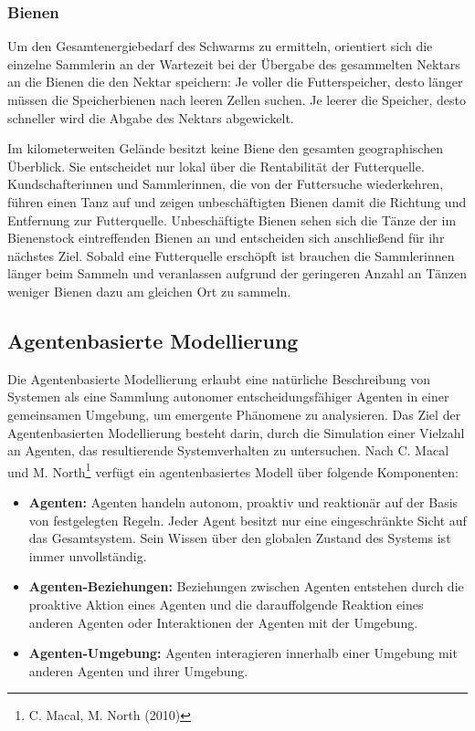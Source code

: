 \documentclass[a4paper, 11pt]{article}
\begin{document}
\subsubsection{Bienen}
Um den Gesamtenergiebedarf des Schwarms zu ermitteln, orientiert sich die einzelne Sammlerin an der Wartezeit bei der Übergabe des gesammelten Nektars an die Bienen die den Nektar speichern: Je voller die Futterspeicher, desto länger müssen die Speicherbienen nach leeren Zellen suchen. Je leerer die Speicher, desto schneller wird die Abgabe des Nektars abgewickelt.
\par Im kilometerweiten Gelände besitzt keine Biene den gesamten geographischen Überblick. Sie entscheidet nur lokal über die Rentabilität der Futterquelle. Kundschafterinnen und Sammlerinnen, die von der Futtersuche wiederkehren, führen einen Tanz auf und zeigen unbeschäftigten Bienen damit die Richtung und Entfernung zur Futterquelle. Unbeschäftigte Bienen sehen sich die Tänze der im Bienenstock eintreffenden Bienen an und entscheiden sich anschließend für ihr nächstes Ziel. Sobald eine Futterquelle erschöpft ist brauchen die Sammlerinnen länger beim Sammeln und veranlassen aufgrund der geringeren Anzahl an Tänzen weniger Bienen dazu am gleichen Ort zu sammeln.
\newpage
\subsection{Agentenbasierte Modellierung}
Die Agentenbasierte Modellierung erlaubt eine natürliche Beschreibung von Systemen als eine Sammlung autonomer entscheidungsfähiger Agenten in einer gemeinsamen Umgebung, um emergente Phänomene zu analysieren. Das Ziel der Agentenbasierten Modellierung besteht darin, durch die Simulation einer Vielzahl an Agenten, das resultierende Systemverhalten zu untersuchen. Nach C. Macal und M. North\footnote{C. Macal, M. North (2010)} verfügt ein agentenbasiertes Modell über folgende Komponenten:
\begin{itemize}
	\item \textbf{Agenten:} Agenten handeln autonom, proaktiv und reaktionär auf der Basis von festgelegten Regeln. Jeder Agent besitzt nur eine eingeschränkte Sicht auf das Gesamtsystem. Sein Wissen über den globalen Zustand des Systems ist immer unvollständig.
	\item \textbf{Agenten-Beziehungen:} Beziehungen zwischen Agenten entstehen durch die proaktive Aktion eines Agenten und die darauffolgende Reaktion eines anderen Agenten oder Interaktionen der Agenten mit der Umgebung.
	\item \textbf{Agenten-Umgebung:} Agenten interagieren innerhalb einer Umgebung mit anderen Agenten und ihrer Umgebung.
\end{itemize}
\end{document}
